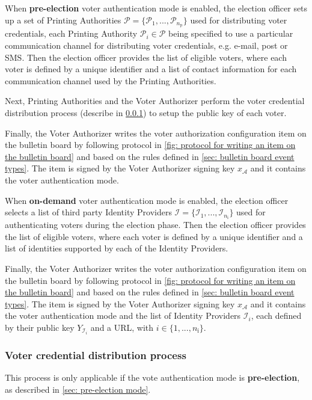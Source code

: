 When \textbf{pre-election} voter authentication mode is enabled, the election officer sets up a set of Printing Authorities $\boldsymbol{\mathcal{P}} = \{ \mathcal{P}_1, ..., \mathcal{P}_{n_\mathrm{p}} \}$ used for distributing voter credentials, each Printing Authority $\mathcal{P}_i \in \boldsymbol{\mathcal{P}}$ being specified to use a particular communication channel for distributing voter credentials, e.g. e-mail, post or SMS. Then the election officer provides the list of eligible voters, where each voter is defined by a unique identifier and a list of contact information for each communication channel used by the Printing Authorities.

Next, Printing Authorities and the Voter Authorizer perform the voter credential distribution process (describe in \cref{sec: voter credential distribution process}) to setup the public key of each voter.

Finally, the Voter Authorizer writes the voter authorization configuration item on the bulletin board by following protocol in \cref{fig: protocol for writing an item on the bulletin board} and based on the rules defined in \cref{sec: bulletin board event types}. The item is signed by the Voter Authorizer signing key $x_\mathcal{A}$ and it contains the voter authentication mode.

When \textbf{on-demand} voter authentication mode is enabled, the election officer selects a list of third party Identity Providers $\boldsymbol{\mathcal{I}} = \{ \mathcal{I}_1, ..., \mathcal{I}_{n_\mathrm{i}} \}$ used for authenticating voters during the election phase. Then the election officer provides the list of eligible voters, where each voter is defined by a unique identifier and a list of identities supported by each of the Identity Providers.

Finally, the Voter Authorizer writes the voter authorization configuration item on the bulletin board by following protocol in \cref{fig: protocol for writing an item on the bulletin board} and based on the rules defined in \cref{sec: bulletin board event types}. The item is signed by the Voter Authorizer signing key $x_\mathcal{A}$ and it contains the voter authentication mode and the list of Identity Providers $\mathcal{I}_i$, each defined by their public key $Y_{\mathcal{I}_i}$ and a URL, with $i \in \{ 1, ..., n_\mathrm{i} \}$.


\subsubsection{Voter credential distribution process} \label{sec: voter credential distribution process}
This process is only applicable if the vote authentication mode is \textbf{pre-election}, as described in \cref{sec: pre-election mode}.

